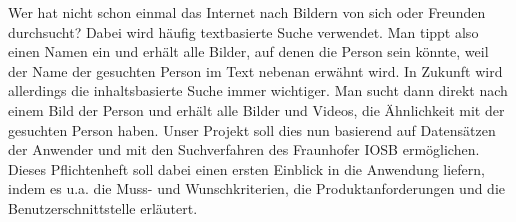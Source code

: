 Wer hat nicht schon einmal das Internet nach Bildern von sich oder Freunden durchsucht? Dabei wird häufig textbasierte Suche verwendet. Man tippt also einen Namen ein und erhält alle Bilder, auf denen die Person sein könnte, weil der Name der gesuchten Person im Text nebenan erwähnt wird. 
\newline
In Zukunft wird allerdings die inhaltsbasierte Suche immer wichtiger. Man sucht dann direkt nach einem Bild der Person und erhält alle Bilder und Videos, die Ähnlichkeit mit der gesuchten Person haben.
\newline
Unser Projekt soll dies nun basierend auf Datensätzen der Anwender und mit den Suchverfahren des Fraunhofer IOSB ermöglichen.
\newline
Dieses Pflichtenheft soll dabei einen ersten Einblick in die Anwendung liefern, indem es u.a. die Muss- und Wunschkriterien, die Produktanforderungen und die Benutzerschnittstelle erläutert.
\pagebreak